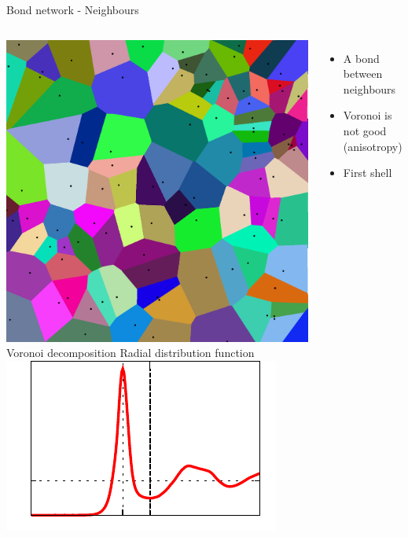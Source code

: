 \begin{frame}{Bond network - Neighbours}
	\begin{columns}
	\includegraphics[width=\columnwidth]{voro2d}\\
	\centering Voronoi decomposition
	\centering Radial distribution function\\
	\includegraphics[width=\columnwidth]{typicalRdf}
	\begin{itemize}
		\item A bond between neighbours
		\item Voronoi is not good (anisotropy)
		\item First shell
	\end{itemize}
	\end{columns}
\end{frame}

